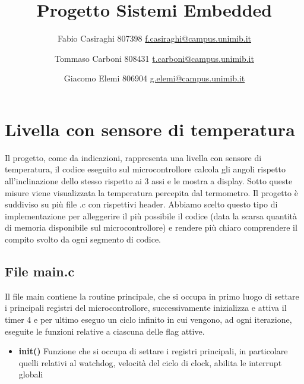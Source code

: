 \documentclass[11pt]{article}
\author{
Fabio Casiraghi 807398 \href{mailto:f.casiraghi@campus.unimib.it}{f.casiraghi@campus.unimib.it}
\and
Tommaso Carboni 808431 \href{mailto:t.carboni@campus.unimib.it} {t.carboni@campus.unimib.it}
\and
Giacomo Elemi 806904 \href{mailto:g.elemi@campus.unimib.it} {g.elemi@campus.unimib.it}
}
\title{Progetto Sistemi Embedded}
\begin{document}
\maketitle
\vspace{2cm}

\section*{Livella con sensore di temperatura}
Il progetto, come da indicazioni, rappresenta una livella con sensore di temperatura, il codice eseguito sul microcontrollore calcola gli angoli rispetto all'inclinazione dello stesso rispetto ai 3 assi e le mostra a display. Sotto queste misure viene visualizzata la temperatura percepita dal termometro.
Il progetto è suddiviso su più file .c con rispettivi header. Abbiamo scelto questo tipo di implementazione per alleggerire il più possibile il codice (data la scarsa quantità di memoria disponibile sul microcontrollore) e rendere più chiaro comprendere il compito svolto da ogni segmento di codice.

\subsection{File main.c}
Il file main contiene la routine principale, che si occupa in primo luogo di settare i principali registri del microcontrollore, successivamente inizializza e attiva il timer 4 e per ultimo eseguo un ciclo infinito in cui vengono, ad ogni iterazione, eseguite le funzioni relative a ciascuna delle flag attive.
\begin{itemize}
\item \textbf{init()} Funzione che si occupa di settare i registri principali, in particolare quelli relativi al watchdog, velocità del ciclo di clock, abilita le interrupt globali
\end{itemize}
\end{document}
